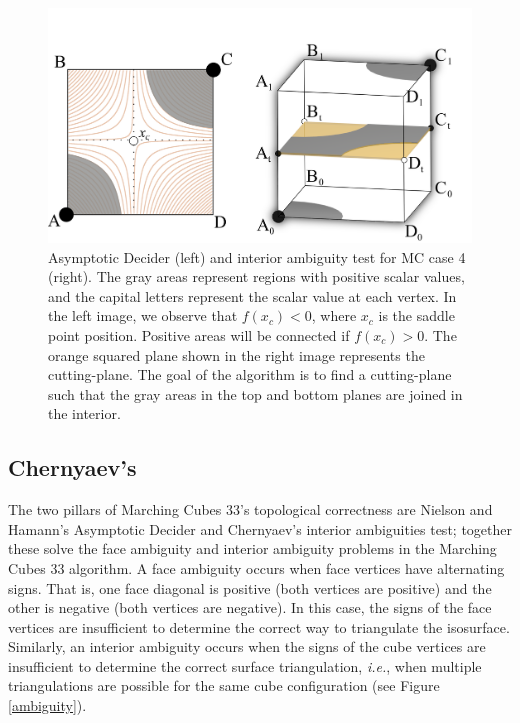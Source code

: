 \begin{figure}[b]
     \centering
     \includegraphics[width=0.95\linewidth]{chapter4/figures/cut-plane-fig.png}
     \caption{Asymptotic Decider (left) and \mc{} interior ambiguity test for MC case 4 (right). The gray areas represent regions with positive scalar values, and the capital letters represent the scalar value at each vertex. In the left image, we observe that $f(x_c) < 0$, where $x_c$ is the saddle point position. Positive areas will be connected if $f(x_c) > 0$. The orange squared plane shown in the right image represents the cutting-plane. The goal of the \mc{} algorithm is to find a cutting-plane such that the gray areas in the top and bottom planes are joined in the interior.}
     \label{interior_ambiguity}
\end{figure}


\subsection{Chernyaev's \mc{}}

The two pillars of Marching Cubes 33's topological correctness are Nielson and Hamann's Asymptotic Decider and Chernyaev's interior ambiguities test; together these solve the face ambiguity and interior ambiguity problems in the Marching Cubes 33 algorithm.
%
A face ambiguity occurs when face vertices have alternating signs. That is, one face diagonal is positive (both vertices are positive) and the other is negative (both vertices are negative). In this case, the signs of the face vertices are insufficient to determine the correct way to triangulate the isosurface. Similarly, an interior ambiguity occurs when the signs of the cube vertices are insufficient to determine the correct surface triangulation, \emph{i.e.}, when multiple triangulations are possible for the same cube configuration (see Figure \ref{ambiguity}).

